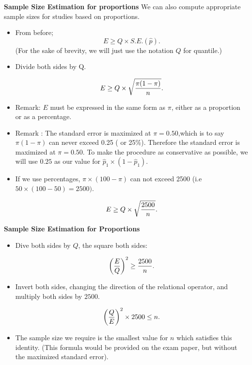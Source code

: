 \documentclass[]{report}
\begin{document}

\noindent \textbf{Sample Size Estimation for proportions}
We can also compute appropriate sample sizes for studies based on proportions.
\begin{itemize}
\item From before; \[ E \geq Q \times S.E.(\hat{p}). \]
(For the sake of brevity, we will just use the notation $Q$ for quantile.)

\item Divide both sides by Q.

\[ E \geq Q \times \sqrt{ {\pi(1-\pi)  \over n} }. \]

\end{itemize}


\begin{itemize}
\item Remark: $E$ must be expressed in the same form as $\pi$, either as a proportion or as a percentage.
\item Remark : The standard error is maximized at $\pi = 0.50$,which is to say $\pi(1-\pi)$ can never exceed 0.25 ( or 25\%). Therefore the standard error is maximized at $\pi = 0.50$. To make the procedure as conservative as possible, we will use $0.25$ as our value for $\hat{p}_1 \times (1 - \hat{p}_1)$.
\item If we use percentages, $\pi \times (100-\pi)$ can not exceed 2500 (i.e $ 50 \times (100-50)=2500)$.

\[ E \geq Q \times \sqrt{{2500 \over n}}. \]


\end{itemize}



\noindent \textbf{Sample Size Estimation for Proportions}

\begin{itemize}

\item Dive both sides by $Q$, the square both sides:

\[ \left({E\over Q}\right)^2 \geq {2500 \over n}. \]

\item Invert both sides, changing the direction of the relational operator, and multiply both sides by $2500$.

\[ \left({Q\over E}\right)^2 \times 2500 \leq n. \]

\item The sample size we require is the smallest value for $n$ which satisfies this identity. (This formula would be provided on the exam paper, but without the maximized standard error).
\end{itemize}
\end{document}
